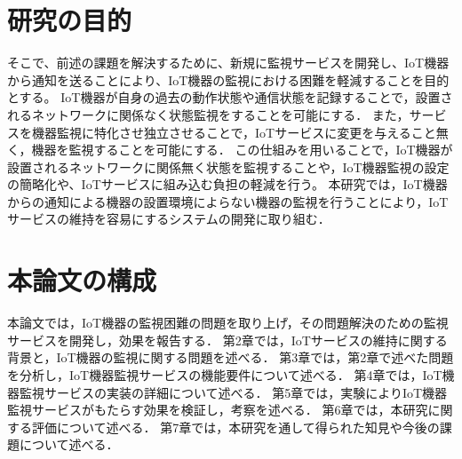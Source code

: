 \section{研究の目的}%
そこで、前述の課題を解決するために、新規に監視サービスを開発し、IoT機器から通知を送ることにより、IoT機器の監視における困難を軽減することを目的とする。
IoT機器が自身の過去の動作状態や通信状態を記録することで，設置されるネットワークに関係なく状態監視をすることを可能にする．
また，サービスを機器監視に特化させ独立させることで，IoTサービスに変更を与えること無く，機器を監視することを可能にする．
この仕組みを用いることで，IoT機器が設置されるネットワークに関係無く状態を監視することや，IoT機器監視の設定の簡略化や、IoTサービスに組み込む負担の軽減を行う。
本研究では，IoT機器からの通知による機器の設置環境によらない機器の監視を行うことにより，IoTサービスの維持を容易にするシステムの開発に取り組む．

\section{本論文の構成}%
本論文では，IoT機器の監視困難の問題を取り上げ，その問題解決のための監視サービスを開発し，効果を報告する．
第2章では，IoTサービスの維持に関する背景と，IoT機器の監視に関する問題を述べる．
第3章では，第2章で述べた問題を分析し，IoT機器監視サービスの機能要件について述べる．
第4章では，IoT機器監視サービスの実装の詳細について述べる．
第5章では，実験によりIoT機器監視サービスがもたらす効果を検証し，考察を述べる．
第6章では，本研究に関する評価について述べる．
第7章では，本研究を通して得られた知見や今後の課題について述べる．


